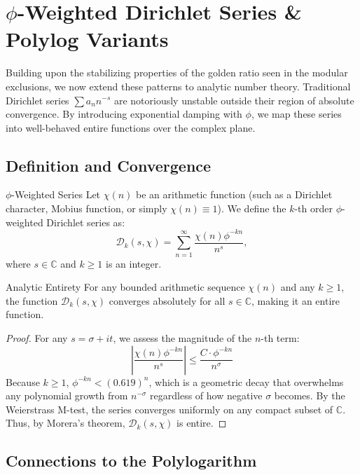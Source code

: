 \section{\(\phi\)-Weighted Dirichlet Series \& Polylog Variants}

Building upon the stabilizing properties of the golden ratio seen in the modular exclusions, we now extend these patterns to analytic number theory. Traditional Dirichlet series \(\sum a_n n^{-s}\) are notoriously unstable outside their region of absolute convergence. By introducing exponential damping with \(\phi\), we map these series into well-behaved entire functions over the complex plane.

\subsection{Definition and Convergence}

\begin{definition}{\(\phi\)-Weighted Series}{}
	Let \(\chi(n)\) be an arithmetic function (such as a Dirichlet character, Mobius function, or simply \(\chi(n) \equiv 1\)). We define the \(k\)-th order \(\phi\)-weighted Dirichlet series as:
	\[
	\mathcal{D}_k(s, \chi) = \sum_{n=1}^\infty \frac{\chi(n) \phi^{-kn}}{n^s},
	\]
	where \(s \in \mathbb{C}\) and \(k \ge 1\) is an integer.
\end{definition}

\begin{theorem}{Analytic Entirety}{}
	For any bounded arithmetic sequence \(\chi(n)\) and any \(k \ge 1\), the function \(\mathcal{D}_k(s, \chi)\) converges absolutely for all \(s \in \mathbb{C}\), making it an entire function.
\end{theorem}
\begin{proof}
	For any \(s = \sigma + it\), we assess the magnitude of the \(n\)-th term:
	\[
	\left| \frac{\chi(n) \phi^{-kn}}{n^s} \right| \le \frac{C \cdot \phi^{-kn}}{n^\sigma}
	\]
	Because \(k \ge 1\), \(\phi^{-kn} < (0.619)^n\), which is a geometric decay that overwhelms any polynomial growth from \(n^{-\sigma}\) regardless of how negative \(\sigma\) becomes. By the Weierstrass M-test, the series converges uniformly on any compact subset of \(\mathbb{C}\). Thus, by Morera's theorem, \(\mathcal{D}_k(s, \chi)\) is entire.
\end{proof}

\subsection{Connections to the Polylogarithm}

